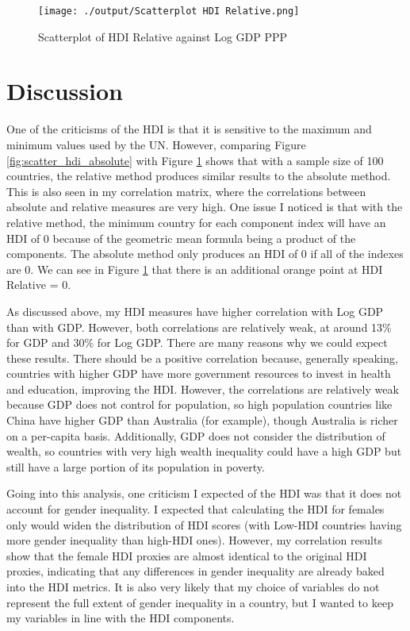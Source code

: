\documentclass[12pt]{article}
\begin{document}
\begin{figure}[H]
\centering
\caption{Scatterplot of HDI Relative against Log GDP PPP}
\texttt{[image: ./output/Scatterplot HDI Relative.png]}
\label{fig:scatter_hdi_relative}
\end{figure}

\section{Discussion}
 One of the criticisms of the HDI is that it is sensitive to the maximum and minimum values used by the UN. However, comparing Figure \ref{fig:scatter_hdi_absolute} with Figure \ref{fig:scatter_hdi_relative} shows that with a sample size of 100 countries, the relative method produces similar results to the absolute method. This is also seen in my correlation matrix, where the correlations between absolute and relative measures are very high. One issue I noticed is that with the relative method, the minimum country for each component index will have an HDI of 0 because of the geometric mean formula being a product of the components. The absolute method only produces an HDI of 0 if all of the indexes are 0. We can see in Figure \ref{fig:scatter_hdi_relative} that there is an additional orange point at HDI Relative = 0.

 As discussed above, my HDI measures have higher correlation with Log GDP than with GDP. However, both correlations are relatively weak, at around 13\% for GDP and 30\% for Log GDP. There are many reasons why we could expect these results. There should be a positive correlation because, generally speaking, countries with higher GDP have more government resources to invest in health and education, improving the HDI. However, the correlations are relatively weak because GDP does not control for population, so high population countries like China have higher GDP than Australia (for example), though Australia is richer on a per-capita basis. Additionally, GDP does not consider the distribution of wealth, so countries with very high wealth inequality could have a high GDP but still have a large portion of its population in poverty.

Going into this analysis, one criticism I expected of the HDI was that it does not account for gender inequality. I expected that calculating the HDI for females only would widen the distribution of HDI scores (with Low-HDI countries having more gender inequality than high-HDI ones). However, my correlation results show that the female HDI proxies are almost identical to the original HDI proxies, indicating that any differences in gender inequality are already baked into the HDI metrics. It is also very likely that my choice of variables do not represent the full extent of gender inequality in a country, but I wanted to keep my variables in line with the HDI components.
\end{document}
